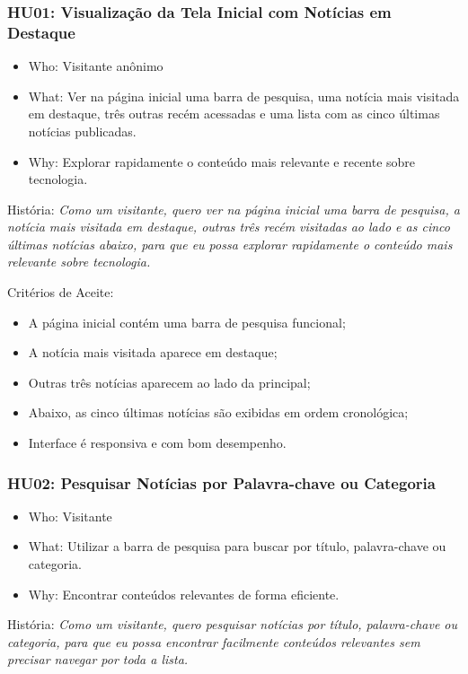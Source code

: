 \subsubsection*{HU01: Visualização da Tela Inicial com Notícias em Destaque}

\begin{itemize}
  \item Who: Visitante anônimo
  \item What: Ver na página inicial uma barra de pesquisa, uma notícia mais visitada em destaque, três outras recém acessadas e uma lista com as cinco últimas notícias publicadas.
  \item Why: Explorar rapidamente o conteúdo mais relevante e recente sobre tecnologia.
\end{itemize}

\noindent História: \textit{Como um visitante, quero ver na página inicial uma barra de pesquisa, a notícia mais visitada em destaque, outras três recém visitadas ao lado e as cinco últimas notícias abaixo, para que eu possa explorar rapidamente o conteúdo mais relevante sobre tecnologia.}

\noindent Critérios de Aceite:
\begin{itemize}
  \item A página inicial contém uma barra de pesquisa funcional;
  \item A notícia mais visitada aparece em destaque;
  \item Outras três notícias aparecem ao lado da principal;
  \item Abaixo, as cinco últimas notícias são exibidas em ordem cronológica;
  \item Interface é responsiva e com bom desempenho.
\end{itemize}

\subsubsection*{HU02: Pesquisar Notícias por Palavra-chave ou Categoria}

\begin{itemize}
  \item Who: Visitante
  \item What: Utilizar a barra de pesquisa para buscar por título, palavra-chave ou categoria.
  \item Why: Encontrar conteúdos relevantes de forma eficiente.
\end{itemize}

\noindent História: \textit{Como um visitante, quero pesquisar notícias por título, palavra-chave ou categoria, para que eu possa encontrar facilmente conteúdos relevantes sem precisar navegar por toda a lista.}

